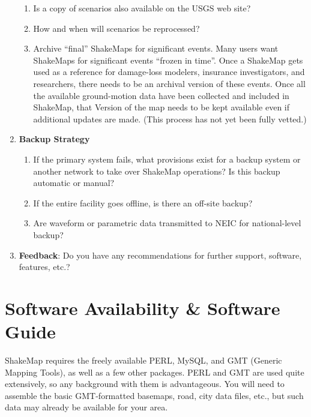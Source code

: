 \documentclass[letterpaper,10pt,english]{sphinxmanual}
\begin{document}
\begin{enumerate}
\begin{enumerate}
\item {} 
Is a copy of scenarios also available on the USGS web site?

\item {} 
How and when will scenarios be reprocessed?

\item {} 
Archive “final'' ShakeMaps for significant events.  Many users want
ShakeMaps for significant events ``frozen in time''. Once a ShakeMap gets
used as a reference for damage-loss modelers, insurance investigators, and
researchers, there needs to be an archival version of these events. Once all the
available ground-motion data have been collected and included in ShakeMap,
that Version of the map needs to be kept available even if additional updates
are made. (This process has not yet been fully vetted.)

\end{enumerate}

\item {} 
\textbf{Backup Strategy}
\begin{enumerate}
\item {} 
If the primary system fails, what provisions exist for a backup system or
another network to take over ShakeMap operations? Is this backup automatic
or manual?

\item {} 
If the entire facility goes offline, is there an off-site backup?

\item {} 
Are waveform or parametric data transmitted to NEIC for national-level
backup?

\end{enumerate}

\item {} 
\textbf{Feedback}:
Do you have any recommendations for further support, software, features, etc.?

\end{enumerate}


\section{Software Availability \& Software Guide}
\label{software_guide:software-availability-software-guide}\label{software_guide:sm35-software-guide}
ShakeMap requires the freely available PERL, MySQL, and GMT (Generic Mapping Tools),
as well as a few other packages. PERL and GMT are used quite extensively, so any background
with them is advantageous. You will need to assemble the basic GMT-formatted basemaps,
road, city data files, etc., but such data may already be available for your area.
\end{document}
